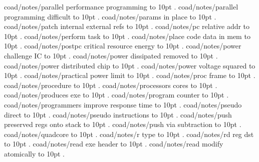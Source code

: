 \smallskip
coad/notes/parallel performance programming \leaders\hbox to 10pt {\hss.\hss}  \hfill {}
\smallskip
coad/notes/parallel programming difficult \leaders\hbox to 10pt {\hss.\hss}  \hfill {}
\smallskip
coad/notes/params in place \leaders\hbox to 10pt {\hss.\hss}  \hfill {}
\smallskip
coad/notes/patch internal external refs \leaders\hbox to 10pt {\hss.\hss}  \hfill {}
\smallskip
coad/notes/pc relative addr \leaders\hbox to 10pt {\hss.\hss}  \hfill {}
\smallskip
coad/notes/perform task \leaders\hbox to 10pt {\hss.\hss}  \hfill {}
\smallskip
coad/notes/place code data in mem \leaders\hbox to 10pt {\hss.\hss}  \hfill {}
\smallskip
coad/notes/postpc critical resource energy \leaders\hbox to 10pt {\hss.\hss}  \hfill {}
\smallskip
coad/notes/power challenge IC \leaders\hbox to 10pt {\hss.\hss}  \hfill {}
\smallskip
coad/notes/power dissipated removed \leaders\hbox to 10pt {\hss.\hss}  \hfill {}
\smallskip
coad/notes/power distributed chip \leaders\hbox to 10pt {\hss.\hss}  \hfill {}
\smallskip
coad/notes/power voltage squared \leaders\hbox to 10pt {\hss.\hss}  \hfill {}
\smallskip
coad/notes/practical power limit \leaders\hbox to 10pt {\hss.\hss}  \hfill {}
\smallskip
coad/notes/proc frame \leaders\hbox to 10pt {\hss.\hss}  \hfill {}
\smallskip
coad/notes/procedure \leaders\hbox to 10pt {\hss.\hss}  \hfill {}
\smallskip
coad/notes/processors cores \leaders\hbox to 10pt {\hss.\hss}  \hfill {}
\smallskip
coad/notes/produces exe \leaders\hbox to 10pt {\hss.\hss}  \hfill {}
\smallskip
coad/notes/program counter \leaders\hbox to 10pt {\hss.\hss}  \hfill {}
\smallskip
coad/notes/programmers improve response time \leaders\hbox to 10pt {\hss.\hss}  \hfill {}
\smallskip
coad/notes/pseudo direct \leaders\hbox to 10pt {\hss.\hss}  \hfill {}
\smallskip
coad/notes/pseudo instructions \leaders\hbox to 10pt {\hss.\hss}  \hfill {}
\smallskip
coad/notes/push preserved regs onto stack \leaders\hbox to 10pt {\hss.\hss}  \hfill {}
\smallskip
coad/notes/push via subtraction \leaders\hbox to 10pt {\hss.\hss}  \hfill {}
\smallskip
coad/notes/quadcore \leaders\hbox to 10pt {\hss.\hss}  \hfill {}
\smallskip
coad/notes/r type \leaders\hbox to 10pt {\hss.\hss}  \hfill {}
\smallskip
coad/notes/rd reg dst \leaders\hbox to 10pt {\hss.\hss}  \hfill {}
\smallskip
coad/notes/read exe header \leaders\hbox to 10pt {\hss.\hss}  \hfill {}
\smallskip
coad/notes/read modify atomically \leaders\hbox to 10pt {\hss.\hss}  \hfill {}
